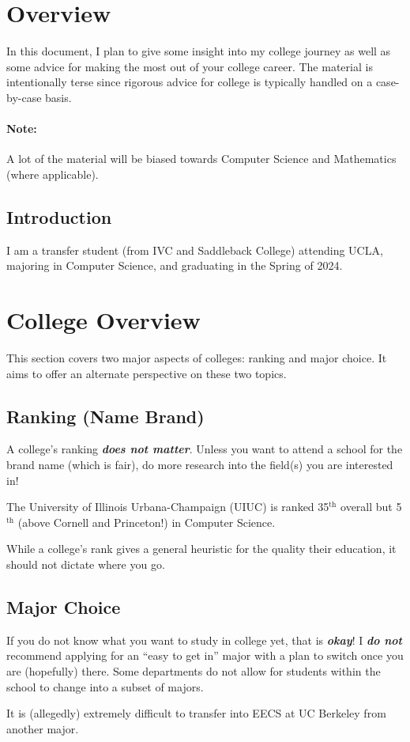 \documentclass[12pt]{article}
\newenvironment{example}{
\begin{tcolorbox}[title=Example, colback=blue!5!white, colframe=black!75!blue]
}{ \end{tcolorbox} }
\newcommand{\ib}[1]{\textit{\textbf{{#1}}}}
\renewcommand{\th}{$^{\text{th}}$ }
\begin{document}
\tableofcontents
\newpage

\section{Overview}
\label{sec:overview}
In this document, I plan to give some insight into my college journey as well as
some advice for making the most out of your college career. The material is
intentionally terse since rigorous advice for college is typically handled on a
case-by-case basis.

\paragraph{Note:} A lot of the material will be biased towards Computer Science
and Mathematics (where applicable).

\subsection{Introduction}
I am a transfer student (from IVC and Saddleback College) attending UCLA,
majoring in Computer Science, and graduating in the Spring of 2024.

\section{College Overview}
This section covers two major aspects of colleges: ranking and major choice. It
aims to offer an alternate perspective on these two topics.

\subsection{Ranking (Name Brand)}
A college's ranking \ib{does not matter}. Unless you want to attend a school for
the brand name (which is fair), do more research into the field(s) you are
interested in!
\begin{example}
    The University of Illinois Urbana-Champaign (UIUC) is ranked 35\th overall
    but 5\th (above Cornell and Princeton!) in Computer Science.
\end{example}

While a college's rank gives a general heuristic for the quality their
education, it should not dictate where you go.


\subsection{Major Choice}
If you do not know what you want to study in college yet, that is \ib{okay}! I
\ib{do not} recommend applying for an ``easy to get in'' major with a plan to
switch once you are (hopefully) there. Some departments do not allow for
students within the school to change into a subset of majors.
\begin{example}
    It is (allegedly) extremely difficult to transfer into EECS at UC Berkeley
    from another major.
\end{example}
\end{document}
